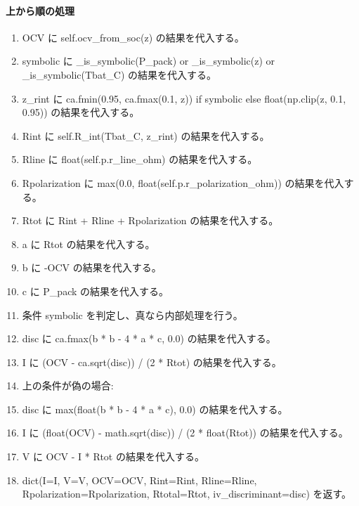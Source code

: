 \documentclass[a4paper,11pt]{article}
\begin{document}
            \paragraph{上から順の処理}
            \begin{enumerate}[leftmargin=1.8em]
            \item OCV に self.ocv\_from\_soc(z) の結果を代入する。
\item symbolic に \_is\_symbolic(P\_pack) or \_is\_symbolic(z) or \_is\_symbolic(Tbat\_C) の結果を代入する。
\item z\_rint に ca.fmin(0.95, ca.fmax(0.1, z)) if symbolic else float(np.clip(z, 0.1, 0.95)) の結果を代入する。
\item Rint に self.R\_int(Tbat\_C, z\_rint) の結果を代入する。
\item Rline に float(self.p.r\_line\_ohm) の結果を代入する。
\item Rpolarization に max(0.0, float(self.p.r\_polarization\_ohm)) の結果を代入する。
\item Rtot に Rint + Rline + Rpolarization の結果を代入する。
\item a に Rtot の結果を代入する。
\item b に -OCV の結果を代入する。
\item c に P\_pack の結果を代入する。
\item 条件 symbolic を判定し、真なら内部処理を行う。
\item   disc に ca.fmax(b * b - 4 * a * c, 0.0) の結果を代入する。
\item   I に (OCV - ca.sqrt(disc)) / (2 * Rtot) の結果を代入する。
\item   上の条件が偽の場合:
\item   disc に max(float(b * b - 4 * a * c), 0.0) の結果を代入する。
\item   I に (float(OCV) - math.sqrt(disc)) / (2 * float(Rtot)) の結果を代入する。
\item V に OCV - I * Rtot の結果を代入する。
\item dict(I=I, V=V, OCV=OCV, Rint=Rint, Rline=Rline, Rpolarization=Rpolarization, Rtotal=Rtot, iv\_discriminant=disc) を返す。
            \end{enumerate}
\end{document}
